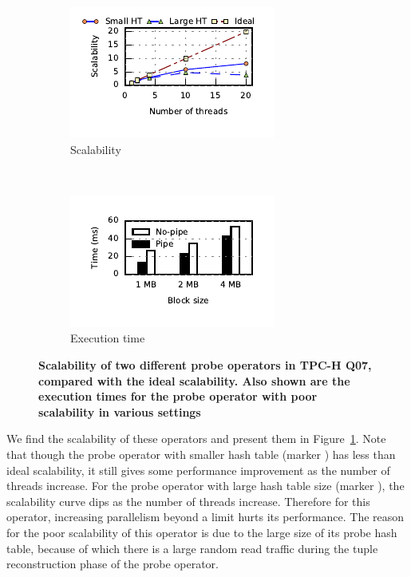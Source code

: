 \begin{figure}[ht]
	\centering
	\begin{subfigure}[ht]{0.48\columnwidth}
		\includegraphics[]{pipeline/figures/tpch-q07-sf50-probe-scalability}	
		\caption{Scalability}
		\label{fig:scalability-tpch-q07}
	\end{subfigure}
	~
	\begin{subfigure}[ht]{0.48\columnwidth}
		\includegraphics[]{pipeline/figures/scalability-impact-tpchq07-op9-performance}	
		\caption{Execution time}		
		\label{fig:scalability-tpch-q07-exec-times}
	\end{subfigure}
	\caption{\textbf{Scalability of two different probe operators in TPC-H Q07, compared with the ideal scalability. Also shown are the execution times for the probe operator with poor scalability in various settings}}
	\label{fig:scalability-plots}
\end{figure}

We find the scalability of these operators and present them in Figure~\ref{fig:scalability-tpch-q07}.
Note that though the probe operator with smaller hash table (marker {\color{PlotOrange}\FilledSmallCircle}) has less than ideal scalability, it still gives some performance improvement as the number of threads increase.
For the probe operator with large hash table size (marker {\color{PlotGreen}\FilledSmallTriangleUp}), the scalability curve dips as the number of threads increase.
Therefore for this operator, increasing parallelism beyond a limit hurts its performance. 
The reason for the poor scalability of this operator is due to the large size of its probe hash table, because of which there is a large random read traffic during the tuple reconstruction phase of the probe operator. 

